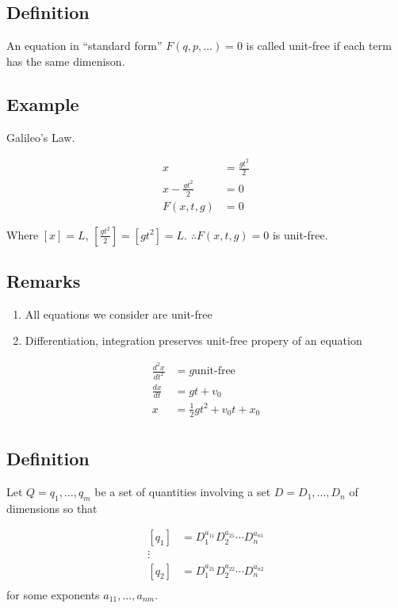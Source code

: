 \documentclass[12pt,twoside]{article}
\begin{document}
\subsection{Definition}
An equation in ``standard form'' $F(q, p, \ldots) = 0$ is called unit-free if
each term has the same dimenison.

\subsection{Example}
Galileo's Law.

\begin{equation}
  \begin{aligned}
    x &= \frac{gt^2}{2} \\
    x - \frac{gt^2}{2} &= 0 \\
    F(x,t,g) &= 0
  \end{aligned}
\end{equation}

Where $[x] = L$, $[\frac{gt^2}{2}] = [gt^2] = L$.
$\therefore F(x,t,g)=0$ is unit-free.

\subsection{Remarks}
\begin{enumerate}
\item All equations we consider are unit-free
\item Differentiation, integration preserves unit-free propery of an equation
\end{enumerate}

\begin{equation}
  \begin{aligned}
    \frac{d^2x}{dt^2} &= g \text{unit-free} \\
    \frac{dx}{dt} &= gt + v_0 \\
    x &= \frac{1}{2}gt^2 + v_0 t + x_0 \\
  \end{aligned}
\end{equation}

\subsection{Definition}
Let $Q = {q_1, \ldots, q_m}$ be a set of quantities involving a set $D =
{D_1,\ldots,D_n}$ of dimensions so that

\begin{equation}
  \begin{aligned}
    [q_1] &= D_1^{a_{11}} D_2^{a_{21}}\cdots D_n^{a_{n1}} \\
    \vdots & \\
    [q_2] &= D_1^{a_{21}} D_2^{a_{22}}\cdots D_n^{a_{n2}} \\
  \end{aligned}
\end{equation}
for some exponents $a_{11}, \ldots, a_{nm}$.
\end{document}
